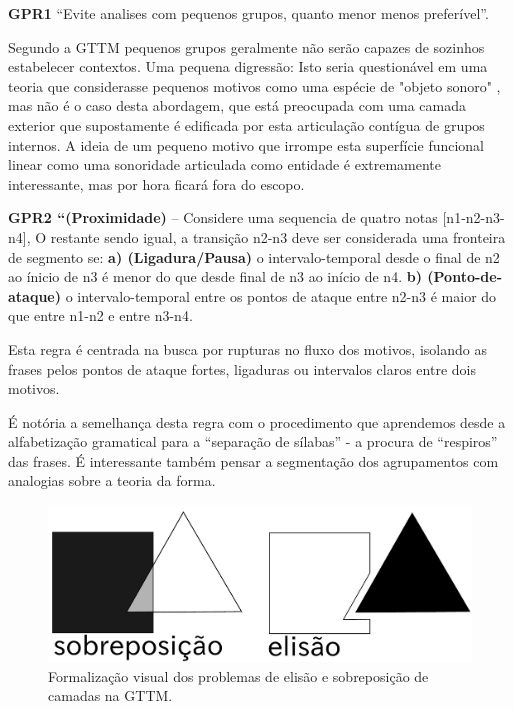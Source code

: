 \documentclass[
	12pt,				%
	openright,			%
	twoside,			%
	a4paper,			%
	english,			%
	french,				%
	spanish,			%
	brazil				%
	]{abntex2}
\begin{document}
\begin{citacao}
\textbf{GPR1} “Evite analises com pequenos grupos, quanto menor menos preferível”.
\cite[ p.43]{lerdahl1983generative}
\end{citacao}

Segundo a GTTM pequenos grupos geralmente não serão capazes de sozinhos estabelecer contextos. Uma pequena digressão: Isto seria questionável em uma teoria que considerasse pequenos motivos como uma espécie de "objeto sonoro"\cite{guigue1995analise} , mas não é o caso desta abordagem, que está preocupada com uma camada exterior que supostamente é edificada por esta articulação contígua de grupos internos. A ideia de um pequeno motivo que irrompe esta superfície funcional linear como uma sonoridade\cite{guigue2012} articulada como entidade é extremamente interessante, mas por hora ficará fora do escopo.

\begin{citacao}
\textbf{GPR2 “(Proximidade)} – Considere uma sequencia de quatro notas [n1-n2-n3-n4], O restante sendo igual, a transição n2-n3 deve ser considerada uma fronteira de segmento se: \textbf{a) (Ligadura/Pausa)} o intervalo-temporal desde o final de n2 ao ínicio de n3 é menor do que desde final de n3 ao início de n4. \textbf{b) (Ponto-de-ataque)} o intervalo-temporal entre os pontos de ataque entre n2-n3 é maior do que entre n1-n2  e entre n3-n4. \cite[ p.45]{lerdahl1983generative}
\end{citacao}

Esta regra é centrada na busca por rupturas no fluxo dos motivos, isolando as frases pelos pontos de ataque fortes, ligaduras ou intervalos claros entre dois motivos.  

É notória a semelhança desta regra com o procedimento que aprendemos desde a alfabetização gramatical para a “separação de sílabas” - a procura de “respiros” das frases. É interessante também pensar a segmentação dos agrupamentos com analogias sobre a teoria da forma.\cite{tenney1980temporal}

\begin{figure}[htb]
	\caption{\label{fig_grafico}Formalização visual dos problemas de elisão e sobreposição de camadas na GTTM. \cite[ p.69]{lerdahl1983generative}}
	\begin{center}
	    \includegraphics[scale=0.25]{gestalt/gestalt_elision_overlay.pdf}
	\end{center}
\end{figure}
\end{document}
